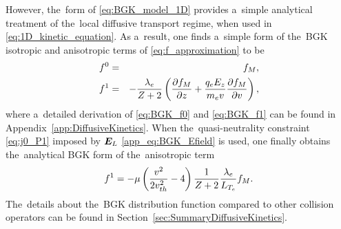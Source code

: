 
However, the~form of \eqref{eq:BGK_model_1D} provides a~simple analytical 
treatment of the~local diffusive transport regime, when used in 
\eqref{eq:1D_kinetic_equation}. As a~result, one finds a~simple form of
the~BGK isotropic and anisotropic terms of \eqref{eq:f_approximation} to be
\begin{eqnarray}
  f^0 &=& f_M ,
  \label{eq:BGK_f0} \\
  f^1 &=& - \frac{\lambda_e}{Z + 2}
  \left( \frac{\partial{f_M}}{\partial{z}} + \frac{q_eE_z}{m_ev}\frac{\partial{f_M}}{\partial{v}} \right) ,
  \label{eq:BGK_f1}
\end{eqnarray}
where 
a~detailed derivation of \eqref{eq:BGK_f0} and \eqref{eq:BGK_f1} 
can be found in Appendix~\ref{app:DiffusiveKinetics}.
When the~quasi-neutrality constraint \eqref{eq:j0_P1} imposed by $\boldsymbol{E}_L$
\eqref{app_eq:BGK_Efield} is used, one finally obtains 
the~analytical BGK form of the~anisotropic term %
\begin{equation}
  f^1 = - \mu 
  \left( \frac{v^2}{2 v_{th}^2} - 4\right)\frac{1}{Z + 2}
  \frac{\lambda_e}{L_{T_e}}f_M
  . 
  \label{eq:BGK_approximation}
\end{equation}
The~details about the~BGK distribution function compared to other
collision operators can be found in Section~\ref{sec:SummaryDiffusiveKinetics}.


